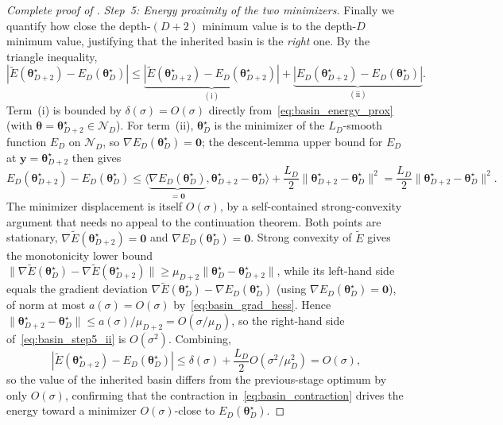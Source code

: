\documentclass[11pt]{article}
\newcommand{\cN}{\mathcal{N}}
\theoremstyle{plain}
\theoremstyle{plain}
\begin{document}
\begin{proof}[Complete proof of ]
\emph{Step~5: Energy proximity of the two minimizers.}
Finally we quantify how close the depth-$(D{+}2)$ minimum value is to
the depth-$D$ minimum value, justifying that the inherited basin is the
\emph{right} one.  By the triangle inequality,
\begin{equation}\label{eq:basin_step5_split}
  |\widetilde{E}(\bm\theta_{D+2}^\star)-E_D(\bm\theta_D^\star)|
  \le\underbrace{|\widetilde{E}(\bm\theta_{D+2}^\star)
     -E_D(\bm\theta_{D+2}^\star)|}_{(\mathrm{i})}
  +\underbrace{|E_D(\bm\theta_{D+2}^\star)
     -E_D(\bm\theta_D^\star)|}_{(\mathrm{ii})} .
\end{equation}
Term~(i) is bounded by $\delta(\sigma)=O(\sigma)$ directly
from~\eqref{eq:basin_energy_prox} (with
$\bm\theta=\bm\theta_{D+2}^\star\in\cN_D$).  For term~(ii), $\bm\theta_D^\star$
is the minimizer of the $L_D$-smooth function $E_D$ on $\cN_D$, so
$\nabla E_D(\bm\theta_D^\star)=\bm 0$; the descent-lemma upper bound for
$E_D$ at $\bm y=\bm\theta_{D+2}^\star$ then gives
\begin{equation}\label{eq:basin_step5_ii}
  E_D(\bm\theta_{D+2}^\star)-E_D(\bm\theta_D^\star)
  \le\langle\underbrace{\nabla E_D(\bm\theta_D^\star)}_{= \bm 0},
       \bm\theta_{D+2}^\star-\bm\theta_D^\star\rangle
  +\frac{L_D}{2}\|\bm\theta_{D+2}^\star-\bm\theta_D^\star\|^2
  =\frac{L_D}{2}\|\bm\theta_{D+2}^\star-\bm\theta_D^\star\|^2 .
\end{equation}
The minimizer displacement is itself $O(\sigma)$, by a self-contained
strong-convexity argument that needs no appeal to the continuation
theorem.  Both points are stationary,
$\nabla\widetilde{E}(\bm\theta_{D+2}^\star)=\bm 0$ and
$\nabla E_D(\bm\theta_D^\star)=\bm 0$.  Strong convexity of
$\widetilde{E}$ gives the monotonicity lower bound
$\|\nabla\widetilde{E}(\bm\theta_D^\star)
-\nabla\widetilde{E}(\bm\theta_{D+2}^\star)\|
\ge\mu_{D+2}\|\bm\theta_D^\star-\bm\theta_{D+2}^\star\|$, while its
left-hand side equals the gradient deviation
$\nabla\widetilde{E}(\bm\theta_D^\star)-\nabla E_D(\bm\theta_D^\star)$
(using $\nabla E_D(\bm\theta_D^\star)=\bm 0$), of norm at most
$a(\sigma)=O(\sigma)$ by~\eqref{eq:basin_grad_hess}.  Hence
$\|\bm\theta_{D+2}^\star-\bm\theta_D^\star\|
\le a(\sigma)/\mu_{D+2}=O(\sigma/\mu_D)$, so the right-hand side
of~\eqref{eq:basin_step5_ii} is $O(\sigma^2)$.  Combining,
\begin{equation}\label{eq:basin_step5_final}
  |\widetilde{E}(\bm\theta_{D+2}^\star)-E_D(\bm\theta_D^\star)|
  \le\delta(\sigma)+\frac{L_D}{2} O(\sigma^2/\mu_D^2)
  =O(\sigma),
\end{equation}
so the value of the inherited basin differs from the previous-stage
optimum by only $O(\sigma)$, confirming that the contraction
in~\eqref{eq:basin_contraction} drives the energy toward a minimizer
$O(\sigma)$-close to $E_D(\bm\theta_D^\star)$.
\end{proof}
\end{document}
